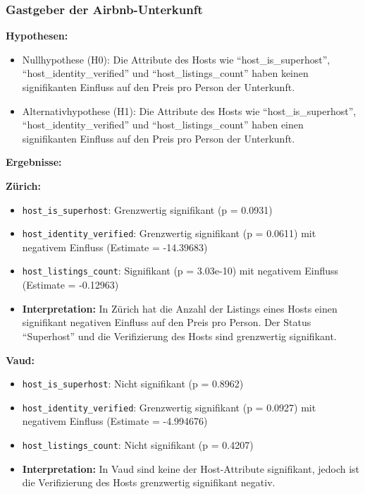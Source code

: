 \documentclass[
  journal,
]{IEEEtran}%
\providecommand{\tightlist}{%
  \setlength{\itemsep}{0pt}\setlength{\parskip}{0pt}}\usepackage{longtable,booktabs,array}
\begin{document}
\subsubsection{Gastgeber der
Airbnb-Unterkunft}\label{gastgeber-der-airbnb-unterkunft}

\textbf{Hypothesen:}

\begin{itemize}
\tightlist
\item
  Nullhypothese (H0): Die Attribute des Hosts wie
  ``host\_is\_superhost'', ``host\_identity\_verified'' und
  ``host\_listings\_count'' haben keinen signifikanten Einfluss auf den
  Preis pro Person der Unterkunft.
\item
  Alternativhypothese (H1): Die Attribute des Hosts wie
  ``host\_is\_superhost'', ``host\_identity\_verified'' und
  ``host\_listings\_count'' haben einen signifikanten Einfluss auf den
  Preis pro Person der Unterkunft.
\end{itemize}

\textbf{Ergebnisse:}

\textbf{Zürich:}

\begin{itemize}
\item
  \texttt{host\_is\_superhost}: Grenzwertig signifikant (p = 0.0931)
\item
  \texttt{host\_identity\_verified}: Grenzwertig signifikant (p =
  0.0611) mit negativem Einfluss (Estimate = -14.39683)
\item
  \texttt{host\_listings\_count}: Signifikant (p = 3.03e-10) mit
  negativem Einfluss (Estimate = -0.12963)
\item
  \textbf{Interpretation:} In Zürich hat die Anzahl der Listings eines
  Hosts einen signifikant negativen Einfluss auf den Preis pro Person.
  Der Status ``Superhost'' und die Verifizierung des Hosts sind
  grenzwertig signifikant.
\end{itemize}

\textbf{Vaud:}

\begin{itemize}
\item
  \texttt{host\_is\_superhost}: Nicht signifikant (p = 0.8962)
\item
  \texttt{host\_identity\_verified}: Grenzwertig signifikant (p =
  0.0927) mit negativem Einfluss (Estimate = -4.994676)
\item
  \texttt{host\_listings\_count}: Nicht signifikant (p = 0.4207)
\item
  \textbf{Interpretation:} In Vaud sind keine der Host-Attribute
  signifikant, jedoch ist die Verifizierung des Hosts grenzwertig
  signifikant negativ.
\end{itemize}
\end{document}
